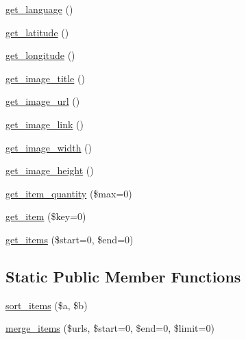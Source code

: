 \begin{DoxyCompactItemize}
\hyperlink{class_simple_pie_a454005c653a1df6d2eebea7acde19d27}{get\-\_\-language} ()
\item 
\hyperlink{class_simple_pie_af2e6691cb4a111688d4c62c7472dac2a}{get\-\_\-latitude} ()
\item 
\hyperlink{class_simple_pie_ad5f038c1a3bfdcfaf8bfef672d95ca4c}{get\-\_\-longitude} ()
\item 
\hyperlink{class_simple_pie_a54277e42f24b873f05fefa0c6ae34a39}{get\-\_\-image\-\_\-title} ()
\item 
\hyperlink{class_simple_pie_a0cae20b467d84317f499e6720263f350}{get\-\_\-image\-\_\-url} ()
\item 
\hyperlink{class_simple_pie_a3210fefe692842d92e26b86fc405492e}{get\-\_\-image\-\_\-link} ()
\item 
\hyperlink{class_simple_pie_a45df9e62c71ed5254faa402374f61955}{get\-\_\-image\-\_\-width} ()
\item 
\hyperlink{class_simple_pie_a1e9ffa1014575ce5df6dd33ddc3e91ff}{get\-\_\-image\-\_\-height} ()
\item 
\hyperlink{class_simple_pie_a6ad619f27b8c24d34a8ff5291ea6b1b9}{get\-\_\-item\-\_\-quantity} (\$max=0)
\item 
\hyperlink{class_simple_pie_a467680e2acc3a03fabe8cd5a2c9a0bcd}{get\-\_\-item} (\$key=0)
\item 
\hyperlink{class_simple_pie_a214d16eb6f395cf252b627768d43339b}{get\-\_\-items} (\$start=0, \$end=0)
\end{DoxyCompactItemize}
\subsection*{Static Public Member Functions}
\begin{DoxyCompactItemize}
\item 
\hyperlink{class_simple_pie_a568f03b1193b5848b38f6d0238ece2fa}{sort\-\_\-items} (\$a, \$b)
\item 
\hyperlink{class_simple_pie_a92f41fc89a83158c437da30e74ee064b}{merge\-\_\-items} (\$urls, \$start=0, \$end=0, \$limit=0)
\end{DoxyCompactItemize}
